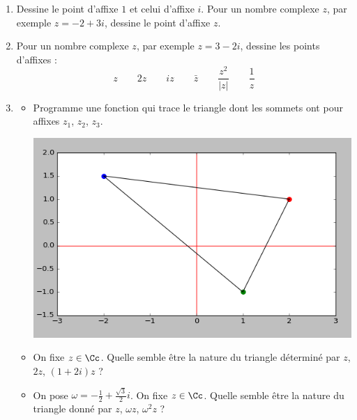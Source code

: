\documentclass[11pt,class=report,crop=false]{standalone}
\begin{document}

\begin{activite}


\begin{enumerate}
  \item Dessine le point d'affixe $1$ et celui d'affixe $i$.
  Pour un nombre complexe $z$, par exemple $z = -2+3i$, dessine le point d'affixe $z$.
   
  \item Pour un nombre complexe $z$, par exemple $z = 3-2i$, dessine les points d'affixes :
  $$z \qquad 2z \qquad iz \qquad \bar z \qquad \frac{z^2}{|z|} \qquad \frac{1}{z}$$
  
  \item 
  \begin{itemize}
    \item Programme une fonction  qui trace le triangle dont les sommets ont pour affixes $z_1$, $z_2$, $z_3$.
 
   \smallskip 
   
\begin{center}
\includegraphics[scale=\myscale,scale=0.5]{ecran-complexes1-3}
\end{center}	 
    
    \item On fixe $z \in \Cc$. 
  Quelle semble être la nature du triangle 
déterminé par $z$, $2z$, $(1+2i)z$ ?   
    
    \item On pose $\omega = -\frac12+\frac{\sqrt3}{2}i$. On fixe $z \in \Cc$.
    Quelle semble être la nature du triangle donné par $z$, $\omega z$, $\omega^2 z$ ? 
\end{itemize}    
  
\end{enumerate} 
\end{activite}
\end{document}
